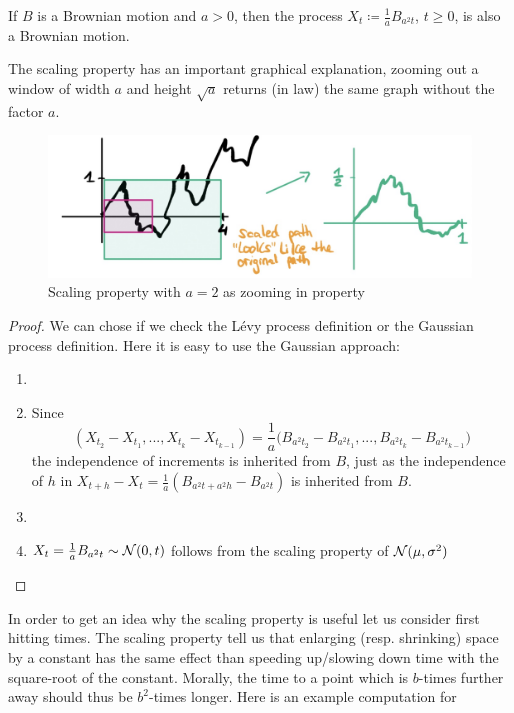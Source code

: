 \begin{laussagewerkzeug}
\begin{prop}
	If $B$ is a Brownian motion and $a>0$, then the process $X_t \coloneqq \frac{1}{a} B_{a^2 t}$, $t\geq 0$, is also a Brownian motion.
\end{prop}
\end{laussagewerkzeug}
The scaling property has an important graphical explanation, zooming out a window of width $a$ and height $\sqrt{a}$ returns (in law) the same graph without the factor $a$.
\begin{figure}[h]
	\begin{center}
		\includegraphics[scale=0.2]{scaling.jpeg}
		\caption*{Scaling property with $a=2$ as zooming in property}
	\end{center}
	\end{figure}
\begin{proof}[Proof]
	We can chose if we check the L\'evy process definition or the Gaussian process definition. Here it is easy to use the Gaussian approach:
	\begin{enumerate}[label=(\roman*)]
		\item \checkmark
		\item Since $$(X_{t_2}- X_{t_{1}},...,X_{t_{k}}-X_{t_{k-1}})=\frac{1}{a}\big( B_{a^2 t_2}-B_{a^2 t_{1}},...,B_{a^2 t_k}- B_{a^2 t_{k-1}}\big)$$ the independence of increments is inherited from $B$, just as the independence of $h$ in $X_{t+h}-X_t = \frac{1}{a}(B_{a^2t+a^2 h}-B_{a^2 t})$ is inherited from $B$.
		\item \checkmark
		\item $X_t = \frac{1}{a} B_{a^2 t} \sim \mathcal{N}(0,t)$ follows from the scaling property of $\mathcal{N}(\mu,\sigma^2)$
	\end{enumerate}
\end{proof}
In order to get an idea why the scaling property is useful let us consider first hitting times. The scaling property tell us that enlarging (resp. shrinking) space by a constant has the same effect than speeding up/slowing down time with the square-root of the constant. Morally, the time to a point which is $b$-times further away should thus be $b^2$-times longer. Here is an example computation for 
